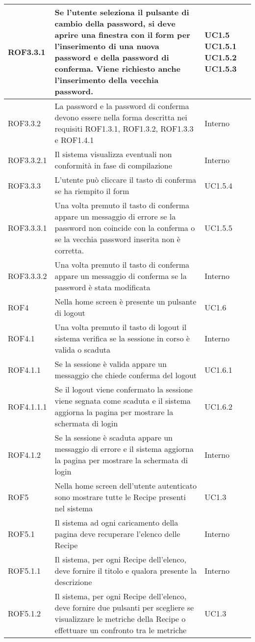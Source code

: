 \begin{center}
\begin{longtable}{| p{2cm} | p{8cm} | p{2cm} |}
		\hline
		ROF3.3.1  &  Se l'utente seleziona il pulsante di cambio della password, si deve aprire una finestra con il form per l'inserimento di una nuova password e della password di conferma. Viene richiesto anche l'inserimento della vecchia password. &  UC1.5 \newline UC1.5.1 \newline UC1.5.2 \newline UC1.5.3 \\
		\hline
		ROF3.3.2  &  La password e la password di conferma devono essere nella forma descritta nei requisiti ROF1.3.1, ROF1.3.2, ROF1.3.3 e ROF1.4.1  &  Interno \\
		\hline
		ROF3.3.2.1  &  Il sistema visualizza eventuali non conformità in fase di compilazione  &  Interno \\
		\hline
		ROF3.3.3  &  L'utente può cliccare il tasto di conferma se ha riempito il form  &  UC1.5.4 \\
		\hline
		ROF3.3.3.1  &  Una volta premuto il tasto di conferma appare un messaggio di errore se la password non coincide con la conferma o se la vecchia password inserita non è corretta.  &  UC1.5.5 \\
		\hline
		ROF3.3.3.2  &  Una volta premuto il tasto di conferma appare un messaggio di conferma se la password è stata modificata  &  Interno \\


		\hline
		ROF4  &  Nella home screen è presente un pulsante di logout  &  UC1.6 \\
		\hline
		ROF4.1  &  Una volta premuto il tasto di logout il sistema verifica se la sessione in corso è valida o scaduta  &  Interno \\
		\hline
		ROF4.1.1  &  Se la sessione è valida appare un messaggio che chiede conferma del logout  &  UC1.6.1 \\
		\hline
		ROF4.1.1.1  &  Se il logout viene confermato la sessione viene segnata come scaduta e il sistema aggiorna la pagina per mostrare la schermata di login  &  UC1.6.2 \\
		\hline
		ROF4.1.2  &  Se la sessione è scaduta appare un messaggio di errore e il sistema aggiorna la pagina per mostrare la schermata di login  &  Interno \\



		\hline
		ROF5  &  Nella home screen dell'utente autenticato sono mostrare tutte le Recipe presenti nel sistema &  UC1.3 \\
		\hline
		ROF5.1  & Il sistema ad ogni caricamento della pagina deve recuperare l'elenco delle Recipe  &  Interno \\
		\hline
		ROF5.1.1  & Il sistema, per ogni Recipe dell'elenco, deve fornire il titolo e qualora presente la descrizione  &  Interno \\
		\hline
		ROF5.1.2  & Il sistema, per ogni Recipe dell'elenco, deve fornire due pulsanti per scegliere se visualizzare le metriche della Recipe o effettuare un confronto tra le metriche &  UC1.3 \\


\end{longtable}
\end{center}
